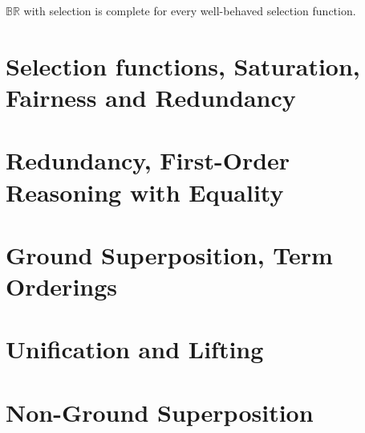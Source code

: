 \documentclass[]{article}
\begin{document}
$\mathbb{BR}$ with selection is complete for every well-behaved selection function.

\section{Selection functions, Saturation, Fairness and Redundancy}

\section{Redundancy, First-Order Reasoning with Equality}

\section{Ground Superposition, Term Orderings}

\section{Unification and Lifting}

\section{Non-Ground Superposition}
\end{document}
